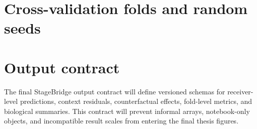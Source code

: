
\section{Cross-validation folds and random seeds}


\section{Output contract}

The final StageBridge output contract will define versioned schemas for receiver-level predictions, context residuals, counterfactual effects, fold-level metrics, and biological summaries. This contract will prevent informal arrays, notebook-only objects, and incompatible result scales from entering the final thesis figures.
